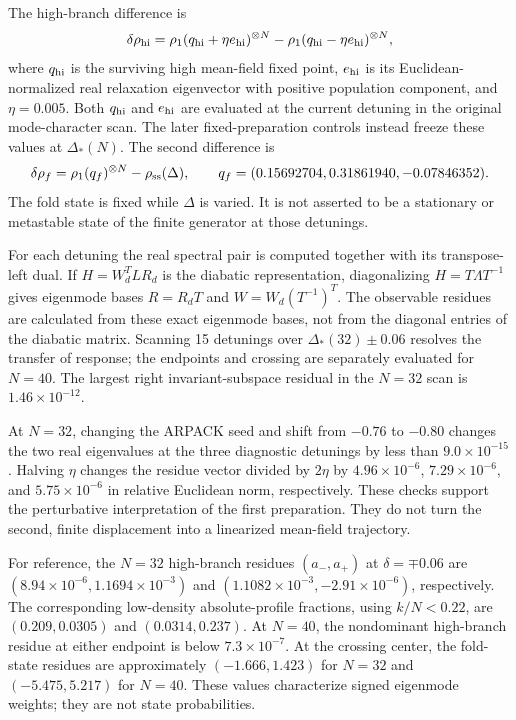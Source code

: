 \documentclass[aps,pra,10pt,onecolumn,superscriptaddress,amsmath,amssymb]{revtex4-2}
\begin{document}
The high-branch difference is
\begin{equation}
 \delta\rho_{\rm hi}=\rho_1(q_{\rm hi}+\eta e_{\rm hi})^{\otimes N}
                    -\rho_1(q_{\rm hi}-\eta e_{\rm hi})^{\otimes N},
\end{equation}
where $q_{\rm hi}$ is the surviving high mean-field fixed point, $e_{\rm hi}$ is its Euclidean-normalized real relaxation eigenvector with positive population component, and $\eta=0.005$. Both $q_{\rm hi}$ and $e_{\rm hi}$ are evaluated at the current detuning in the original mode-character scan. The later fixed-preparation controls instead freeze these values at $\Delta_*(N)$. The second difference is
\begin{equation}
 \delta\rho_f=\rho_1(q_f)^{\otimes N}-\rho_{\rm ss}(\Delta),
 \qquad q_f=(0.15692704,0.31861940,-0.07846352).
\end{equation}
The fold state is fixed while $\Delta$ is varied. It is not asserted to be a stationary or metastable state of the finite generator at those detunings.

For each detuning the real spectral pair is computed together with its transpose-left dual. If $H=W_d^TLR_d$ is the diabatic representation, diagonalizing $H=T\Lambda T^{-1}$ gives eigenmode bases $R=R_dT$ and $W=W_d(T^{-1})^T$. The observable residues are calculated from these exact eigenmode bases, not from the diagonal entries of the diabatic matrix. Scanning 15 detunings over $\Delta_*(32)\pm0.06$ resolves the transfer of response; the endpoints and crossing are separately evaluated for $N=40$. The largest right invariant-subspace residual in the $N=32$ scan is $1.46\times10^{-12}$.

At $N=32$, changing the ARPACK seed and shift from $-0.76$ to $-0.80$ changes the two real eigenvalues at the three diagnostic detunings by less than $9.0\times10^{-15}$. Halving $\eta$ changes the residue vector divided by $2\eta$ by $4.96\times10^{-6}$, $7.29\times10^{-6}$, and $5.75\times10^{-6}$ in relative Euclidean norm, respectively. These checks support the perturbative interpretation of the first preparation. They do not turn the second, finite displacement into a linearized mean-field trajectory.

For reference, the $N=32$ high-branch residues $(a_-,a_+)$ at $\delta=\mp0.06$ are $(8.94\times10^{-6},1.1694\times10^{-3})$ and $(1.1082\times10^{-3},-2.91\times10^{-6})$, respectively. The corresponding low-density absolute-profile fractions, using $k/N<0.22$, are $(0.209,0.0305)$ and $(0.0314,0.237)$. At $N=40$, the nondominant high-branch residue at either endpoint is below $7.3\times10^{-7}$. At the crossing center, the fold-state residues are approximately $(-1.666,1.423)$ for $N=32$ and $(-5.475,5.217)$ for $N=40$. These values characterize signed eigenmode weights; they are not state probabilities.
\end{document}
